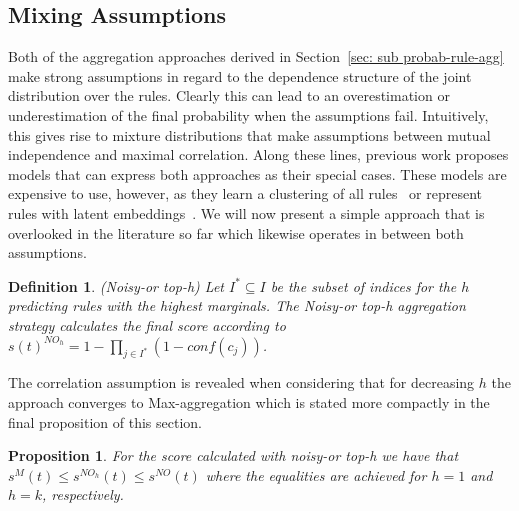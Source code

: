 \documentclass{article}
\theoremstyle{plain}
\newtheorem{proposition}[theorem]{Proposition}
\newtheorem{definition}[theorem]{Definition}
\theoremstyle{remark}
\newcommand{\atomrule}{c}
\newcommand{\indexSetFired}{I}
\begin{document}
\subsection{Mixing Assumptions}\label{sec:mixing}

Both of the aggregation approaches derived in Section~\ref{sec: sub probab-rule-agg} make strong assumptions in regard to the dependence structure of the joint distribution over the rules. Clearly this can lead to an overestimation or underestimation of the final probability when the assumptions fail. Intuitively, this gives rise to mixture distributions that make assumptions between mutual independence and maximal correlation. Along these lines, previous work proposes models that can express both approaches as their special cases. These models are expensive to use, however, as they learn a clustering of all rules~\cite{ott2021safran} or represent rules with latent embeddings~\cite{betz2022supervised}. We will now present a simple approach that is overlooked in the literature so far which likewise operates in between both assumptions.


\begin{definition}(Noisy-or top-h)
Let $\indexSetFired^* \subseteq \indexSetFired$ be the subset of indices for the $h$ predicting rules with the highest marginals. The Noisy-or top-h aggregation strategy calculates the final score according to $s(t)^{NO_h} = 1-\prod_{j \in \indexSetFired^*}(1-conf(\atomrule_j))$.
\end{definition}
The correlation assumption is revealed when considering that for decreasing $h$ the approach converges to Max-aggregation which is stated more compactly in the final proposition of this section.
\begin{proposition}
For the score calculated with noisy-or top-h we have that $s^{M}(t)\leq s^{NO_h}(t) \leq s^{NO}(t)$ where the equalities are achieved for $h=1$ and $h=k$, respectively.
\end{proposition}
\end{document}
